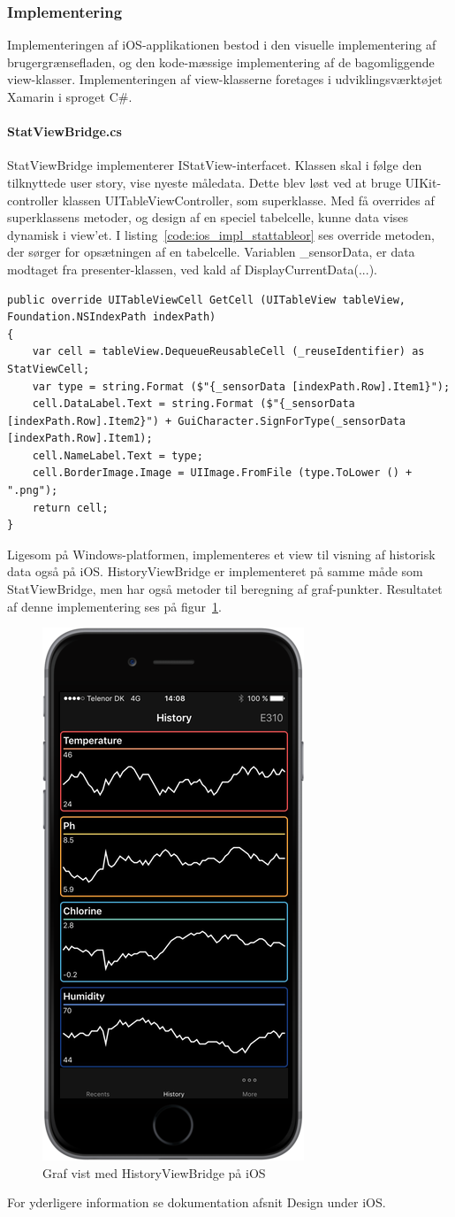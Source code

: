 \subsubsection{Implementering}
Implementeringen af iOS-applikationen bestod i den visuelle implementering af brugergrænsefladen, og den kode-mæssige implementering af de bagomliggende view-klasser. Implementeringen af view-klasserne foretages i udviklingsværktøjet Xamarin i sproget C\#.

\paragraph{StatViewBridge.cs}
StatViewBridge implementerer IStatView-interfacet. Klassen skal i følge den tilknyttede user story, vise nyeste måledata. Dette blev løst ved at bruge UIKit-controller klassen UITableViewController, som superklasse. Med få overrides af superklassens metoder, og design af en speciel tabelcelle, kunne data vises dynamisk i view'et. I listing~\ref{code:ios_impl_stattableor} ses override metoden, der sørger for opsætningen af en tabelcelle. Variablen \_sensorData, er data modtaget fra presenter-klassen, ved kald af DisplayCurrentData(...).

\begin{lstlisting}[caption={Override af UITableViewController-metoden GetCell},label={code:ios_impl_stattableor}]
public override UITableViewCell GetCell (UITableView tableView, Foundation.NSIndexPath indexPath)
{	
	var cell = tableView.DequeueReusableCell (_reuseIdentifier) as StatViewCell;
	var type = string.Format ($"{_sensorData [indexPath.Row].Item1}");
	cell.DataLabel.Text = string.Format ($"{_sensorData [indexPath.Row].Item2}") + GuiCharacter.SignForType(_sensorData [indexPath.Row].Item1);
	cell.NameLabel.Text = type;
	cell.BorderImage.Image = UIImage.FromFile (type.ToLower () + ".png");
	return cell;
}
\end{lstlisting}

Ligesom på Windows-platformen, implementeres et view til visning af historisk data også på iOS. HistoryViewBridge er implementeret på samme måde som StatViewBridge, men har også metoder til beregning af graf-punkter. Resultatet af denne implementering ses på figur~\ref{fig:ios_imp_historyview}.

\begin{figure}
\centering
\includegraphics[width=0.3\linewidth]{figs/implementering/ios_imp_historyview}
\caption{Graf vist med HistoryViewBridge på iOS}
\label{fig:ios_imp_historyview}
\end{figure}

For yderligere information se dokumentation afsnit Design under iOS.